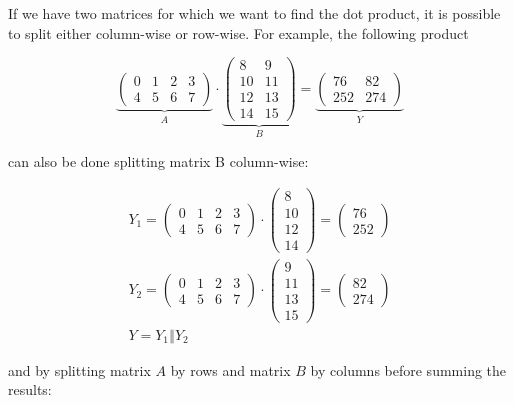 \documentclass{article}
\begin{document}
If we have two matrices for which we want to find the dot product, it is possible to split either column-wise or row-wise. For example, the following product

\[\underbrace{\begin{pmatrix}
0 & 1 & 2 & 3\\
4 & 5 & 6 & 7
\end{pmatrix}}_{A}\cdot \underbrace{\begin{pmatrix}
8 & 9\\
10 & 11\\
12 & 13\\
14 & 15
\end{pmatrix}}_{B}=\underbrace{\begin{pmatrix}
76 & 82\\
252 & 274
\end{pmatrix}}_{Y}\]

can also be done splitting matrix B column-wise:

\begin{gather*}
  Y_1=\begin{pmatrix}
    0 & 1 & 2 & 3\\
    4 & 5 & 6 & 7
    \end{pmatrix}\cdot \begin{pmatrix}8\\10\\12\\14\end{pmatrix}
    =\begin{pmatrix}76\\252\end{pmatrix} \\
    Y_2=\begin{pmatrix}
      0 & 1 & 2 & 3\\
      4 & 5 & 6 & 7
      \end{pmatrix}\cdot \begin{pmatrix}9\\11\\13\\15\end{pmatrix}
      =\begin{pmatrix}82\\274\end{pmatrix} \\
      Y=Y_1 \mathbin\Vert Y_2
\end{gather*}

and by splitting matrix \(A\) by rows and matrix \(B\) by columns before summing the results:
\end{document}
